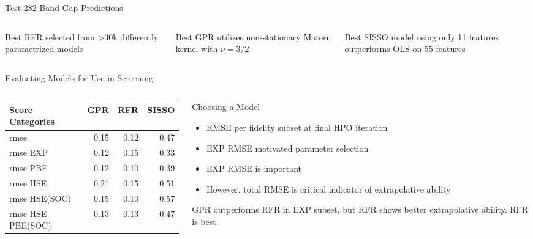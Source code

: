 \documentclass[10pt, aspectratio=169, presentation]{beamer}
\begin{document}
\begin{frame}[label={sec:orga987518}]{Test 282 Band Gap Predictions}
 
\begin{center}

\end{center}

\begin{columns}
\begin{column}{0.3\columnwidth}
Best RFR selected from >30k differently parametrized models
\end{column}

\begin{column}{0.3\columnwidth}
Best GPR utilizes non-stationary Matern kernel with \(\nu=3\slash{}2\)
\end{column}

\begin{column}{0.3\columnwidth}
Best SISSO model using only 11 features outperforms OLS on 55 features
\end{column}
\end{columns}
\end{frame}

\begin{frame}[label={sec:orgfdc5018}]{Evaluating Models for Use in Screening}
\begin{columns}
\begin{column}{0.5\columnwidth}
\begin{center}
\begin{tabular}{lrrr}
Score Categories & GPR & RFR & SISSO\\[0pt]
\hline
rmse & 0.15 & 0.12 & 0.47\\[0pt]
rmse EXP & 0.12 & 0.15 & 0.33\\[0pt]
rmse PBE & 0.12 & 0.10 & 0.39\\[0pt]
rmse HSE & 0.21 & 0.15 & 0.51\\[0pt]
rmse HSE(SOC) & 0.15 & 0.10 & 0.57\\[0pt]
rmse HSE-PBE(SOC) & 0.13 & 0.13 & 0.47\\[0pt]
\end{tabular}
\end{center}
\end{column}

\begin{column}{0.5\columnwidth}
\begin{block}{Choosing a Model}
\begin{itemize}
\item RMSE per fidelity subset at final HPO iteration
\item EXP RMSE motivated parameter selection
\item EXP RMSE is important
\item However, total RMSE is critical indicator of extrapolative ability
\end{itemize}

GPR outperforms RFR in EXP subset, but RFR shows better extrapolative
ability. RFR is best.
\end{block}
\end{column}
\end{columns}
\end{frame}
\end{document}
